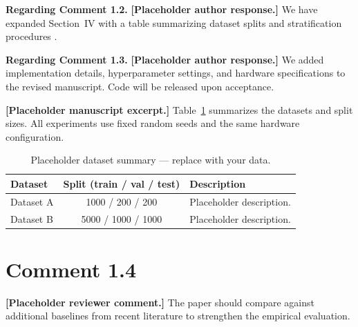 \begin{refsegment}
\begin{authorresponse}
\noindent\textbf{Regarding Comment 1.2.}
\textbf{[Placeholder author response.]} We have expanded Section~IV with a table summarizing dataset splits and stratification procedures \cite{placeholder-dataset}.

\SplitChangeSection

\noindent\textbf{Regarding Comment 1.3.}
\textbf{[Placeholder author response.]} We added implementation details, hyperparameter settings, and hardware specifications to the revised manuscript. Code will be released upon acceptance.
\end{authorresponse}

\begin{authorchange}

\textbf{[Placeholder manuscript excerpt.]} Table~\ref{tab:splits} summarizes the datasets and split sizes. All experiments use fixed random seeds and the same hardware configuration.

\begin{table}[2]
    \centering
    \caption{Placeholder dataset summary --- replace with your data.}
    \begin{tabularx}{\linewidth}{|l|c|X|}
        \hline
        \textbf{Dataset} & \textbf{Split (train / val / test)} & \textbf{Description} \\
        \hline
        Dataset A & 1000 / 200 / 200 & Placeholder description. \\
        \hline
        Dataset B & 5000 / 1000 / 1000 & Placeholder description. \\
        \hline
    \end{tabularx}
    \label{tab:splits}
\end{table}
\end{authorchange}
\RRSectionBibliography
\end{refsegment}

\section{Comment 1.4}
\begin{reviewercomment}
\textbf{[Placeholder reviewer comment.]} The paper should compare against additional baselines from recent literature to strengthen the empirical evaluation.
\end{reviewercomment}

